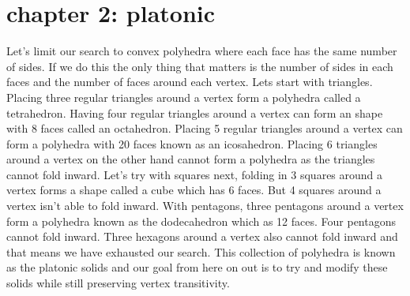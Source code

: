 \documentclass{article}
\begin{document}
\section*{chapter 2: platonic}
Let's limit our search to convex polyhedra where each face has the same number of sides. If we do this the only thing that matters is the number of sides in each faces and the number of faces around each vertex. Lets start with triangles. Placing three regular triangles around a vertex form a polyhedra called a tetrahedron. Having four regular triangles around a vertex can form an shape with 8 faces called an octahedron. Placing 5 regular triangles around a vertex can form a polyhedra with 20 faces known as an icosahedron. Placing 6 triangles around a vertex on the other hand cannot form a polyhedra as the triangles cannot fold inward. Let's try with squares next, folding in 3 squares around a vertex forms a shape called a cube which has 6 faces. But 4 squares around a vertex isn't able to fold inward. With pentagons, three pentagons around a vertex form a polyhedra known as the dodecahedron which as 12 faces. Four pentagons cannot fold inward. Three hexagons around a vertex also cannot fold inward and that means we have exhausted our search. This collection of polyhedra is known as the platonic solids and our goal from here on out is to try and modify these solids while still preserving vertex transitivity.
\end{document}
